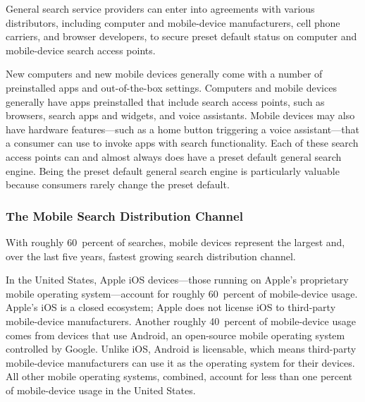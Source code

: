 \documentclass[11pt,b5paper,headings=small]{scrartcl}
\begin{document}

General search service providers can enter into agreements with various
distributors, including computer and mobile-device manufacturers, cell phone carriers, and
browser developers, to secure preset default status on computer and mobile-device search access
points.


New computers and new mobile devices generally come with a number of
preinstalled apps and out-of-the-box settings. Computers and mobile devices generally have apps
preinstalled that include search access points, such as browsers, search apps and widgets, and
voice assistants. Mobile devices may also have hardware features—such as a home button
triggering a voice assistant—that a consumer can use to invoke apps with search functionality.
Each of these search access points can and almost always does have a preset default general
search engine. Being the preset default general search engine is particularly valuable because
consumers rarely change the preset default.




\subsubsection{The Mobile Search Distribution Channel}
With roughly 60~percent of searches, mobile devices represent the largest and,
over the last five years, fastest growing search distribution channel.


In the United States, Apple iOS devices—those running on Apple’s proprietary
mobile operating system—account for roughly 60~percent of mobile-device usage. Apple’s iOS
is a closed ecosystem; Apple does not license iOS to third-party mobile-device manufacturers.
Another roughly 40~percent of mobile-device usage comes from devices that use Android, an
open-source mobile operating system controlled by Google. Unlike iOS, Android is licensable,
which means third-party mobile-device manufacturers can use it as the operating system for their
devices. All other mobile operating systems, combined, account for less than one percent of
mobile-device usage in the United States.

\end{document}
